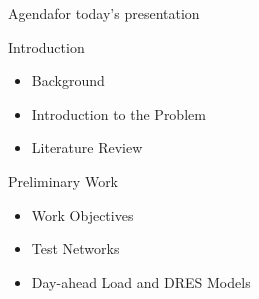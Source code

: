 \documentclass[xcolor=svgnames,aspectratio=32,8pt]{beamer}
\begin{document}
\begin{frame}
  {Agenda}{for today's presentation}

  \begin{minipage}[!h]{0.5\textwidth}
    \begin{block}{Introduction}
    \begin{itemize}
    \item Background
    \item Introduction to the Problem
    \item Literature Review
    \end{itemize}
    \end{block}
  \pause
  \end{minipage}%
  \begin{minipage}[!h]{0.5\textwidth}
    \begin{block}{Preliminary Work}
    \begin{itemize}
    \item Work Objectives
    \item Test Networks
    \item Day-ahead Load and DRES Models
    \end{itemize}
    \end{block}
  \pause
  \end{minipage}


\end{frame}
\end{document}
